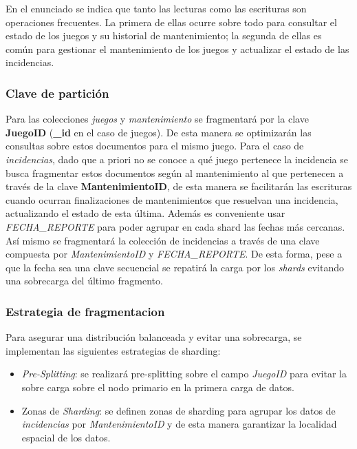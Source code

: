 \documentclass[]{article}
\begin{document}
En el enunciado se indica que tanto las lecturas como las escrituras son operaciones frecuentes. La primera de ellas ocurre sobre todo para consultar el estado de los juegos y su historial de mantenimiento; la segunda de ellas es común para gestionar el mantenimiento de los juegos y actualizar el estado de las incidencias.

\subsubsection{Clave de partición}
\label{subsubsec:particion_juegos}

Para las colecciones \textit{juegos} y \textit{mantenimiento} se fragmentará por la clave \textbf{JuegoID} (\textbf{\_id} en el caso de juegos). De esta manera se optimizarán las consultas sobre estos documentos para el mismo juego.
Para el caso de \textit{incidencias}, dado que a priori no se conoce a qué juego pertenece la incidencia se busca fragmentar estos documentos según al mantenimiento al que pertenecen a través de la clave \textbf{MantenimientoID}, de esta manera se facilitarán las escrituras cuando ocurran finalizaciones de mantenimientos que resuelvan una incidencia, actualizando el estado de esta última. Además es conveniente usar \textit{FECHA\_REPORTE} para poder agrupar en cada shard las fechas más cercanas. Así mismo se fragmentará la colección de incidencias a través de una clave compuesta por \textit{MantenimientoID} y \textit{FECHA\_REPORTE}. De esta forma, pese a que la fecha sea una clave secuencial se repatirá la carga por los \textit{shards} evitando una sobrecarga del último fragmento.

\subsubsection{Estrategia de fragmentacion}
\label{subsubsec:fragmentacion_juegos}

Para asegurar una distribución balanceada y evitar una sobrecarga, se implementan las siguientes estrategias de sharding:
\begin{itemize}
    \item \textit{Pre-Splitting}: se realizará pre-splitting sobre el campo \textit{JuegoID} para evitar la sobre carga sobre el nodo primario en la primera carga de datos.
    \item Zonas de \textit{Sharding}: se definen zonas de sharding para agrupar los datos de \textit{incidencias} por \textit{MantenimientoID} y de esta manera garantizar la localidad espacial de los datos.
\end{itemize}
\end{document}
